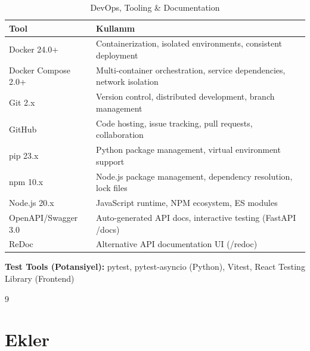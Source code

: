 \documentclass[a4paper,12pt]{report}
\begin{document}
\begin{table}[h]
\centering
\small
\begin{tabular}{|l|p{10.5cm}|}
\hline
\textbf{Tool} & \textbf{Kullanım} \\ \hline
Docker 24.0+ & Containerization, isolated environments, consistent deployment \\ \hline
Docker Compose 2.0+ & Multi-container orchestration, service dependencies, network isolation \\ \hline
Git 2.x & Version control, distributed development, branch management \\ \hline
GitHub & Code hosting, issue tracking, pull requests, collaboration \\ \hline
pip 23.x & Python package management, virtual environment support \\ \hline
npm 10.x & Node.js package management, dependency resolution, lock files \\ \hline
Node.js 20.x & JavaScript runtime, NPM ecosystem, ES modules \\ \hline
OpenAPI/Swagger 3.0 & Auto-generated API docs, interactive testing (FastAPI /docs) \\ \hline
ReDoc & Alternative API documentation UI (/redoc) \\ \hline
\end{tabular}
\caption{DevOps, Tooling \& Documentation}
\end{table}

\vspace{0.2cm}

\noindent\textbf{Test Tools (Potansiyel):} pytest, pytest-asyncio (Python), Vitest, React Testing Library (Frontend)
\begin{thebibliography}{9}


\end{thebibliography}

\appendix

\chapter{Ekler}

\end{document}
